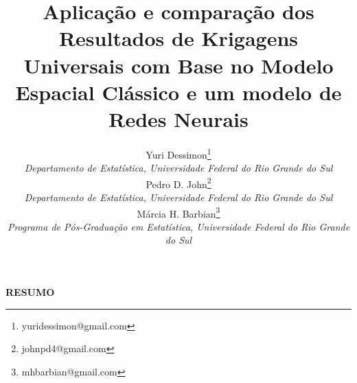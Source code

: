 \documentclass{2ssmeeting}
\begin{document}
\title{Aplicação e comparação dos Resultados de Krigagens Universais com Base no Modelo Espacial Clássico e um modelo de Redes Neurais}


\author{
    {\large Yuri Dessimon}\thanks{yuridessimon@gmail.com}\\ 
    {\small \textit{Departamento de Estatística, Universidade Federal do Rio Grande do Sul}} \\
    {\large Pedro D. John}\thanks{johnpd4@gmail.com}\\
    {\small \textit{Departamento de Estatística, Universidade Federal do Rio Grande do Sul}}  \\
    {\large Márcia H. Barbian}\thanks{mhbarbian@gmail.com}\\
    {\small \textit{Programa de Pós-Graduação em Estatística, Universidade Federal do Rio Grande do Sul}}
}
\criartitulo



\vspace{1cm}

\textbf{RESUMO}

\vspace{1cm}
\end{document}

